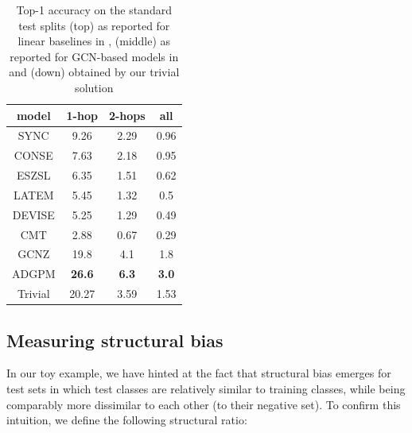 \begin{table}[h!]
\centering
\caption{Top-1 accuracy on the standard test splits (top) as reported for linear baselines in \cite{xian2017zero}, (middle) as reported for GCN-based models in \cite{kampffmeyer2018rethinking} and (down) obtained by our trivial solution}
\begin{tabular}{c c c c  }
\hline
model& 1-hop & 2-hops & all \\
\hline
SYNC  \cite{changpinyo2016synthesized}  & 9.26 & 2.29 & 0.96 \\
CONSE \cite{norouzi2013zero}            & 7.63 & 2.18 & 0.95 \\
ESZSL \cite{romera2015embarrassingly}   & 6.35 & 1.51 & 0.62 \\
LATEM \cite{xian2016latent}             & 5.45 & 1.32 & 0.5  \\
DEVISE\cite{frome2013devise}            & 5.25 & 1.29 & 0.49 \\
CMT   \cite{socher2013zero}             & 2.88 & 0.67 & 0.29 \\
\hline
GCNZ  \cite{wang2018zero}               & 19.8  &  4.1  & 1.8 \\
ADGPM \cite{kampffmeyer2018rethinking}  & \textbf{26.6}  &  \textbf{6.3}  & \textbf{3.0} \\
\hline
Trivial                                 & 20.27 & 3.59  & 1.53\\
\hline
\end{tabular}
\end{table}


\subsection{Measuring structural bias}
In our toy example, we have hinted at the fact that structural bias emerges 
for test sets in which test classes are relatively similar to training classes,  
while being comparably more dissimilar to each other (to their negative set). 
To confirm this intuition, we define the following structural ratio:

